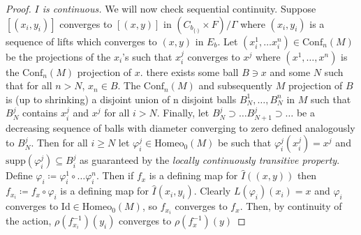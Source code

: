 \documentclass[10pt, oneside]{article}
\newcommand{\homeo}[1][S^1]{\text{Homeo}_0(#1)}
\newcommand{\conf}[2][S^1]{\text{Conf}_{#2}(#1)}
\newcommand{\set}{{\{\cdot\}}}
\newcommand{\maxcov}{C_{b_\set}}
\theoremstyle{definition}
\theoremstyle{definition}
\begin{document}
\begin{proof}
    \medskip
    {\it $I$ is continuous.} We will now check sequential continuity. Suppose $[(x_i, y_i)]$ converges to $[(x, y)]$ in $(\maxcov\times F)/\Gamma$ where $(x_i, y_i)$ is a sequence of lifts which converges to $(x,y)$ in $E_b$. Let $(x_i^1,\dots x_i^n)\in\conf[M]{n}$ be the projections of the $x_i$'s such that $x_i^j$ converges to $x^j$ where $(x^1,\dots, x^n)$ is the $\conf[M]{n}$ projection of $x$. there exists some ball $B\ni x$ and some $N$ such that for all $n> N$, $x_n\in B$. The $\conf[M]{n}$ and subsequently $M$ projection of $B$ is (up to shrinking) a disjoint union of n disjoint balls $B_N^1,\dots,B_N^n$ in $M$ such that $B_N^j$ contains $x_i^j$ and $x^j$ for all $i>N$. Finally, let $B_N^j\supset\dots B_{N+1}^j\supset\dots$ be a decreasing sequence of balls with diameter converging to zero defined analogously to $B_N^j$. Then for all $i\geq N$ let $\varphi_i^j\in\homeo[M]$ be such that $\varphi_i^j(x_i^j)=x^j$ and $\text{supp}(\varphi_i^j)\subseteq B_i^j$ as guaranteed by the {\it locally continuously transitive property}. Define $\varphi_i \coloneqq \varphi^1_i\circ\dots\varphi^n_i$. Then if $f_x$ is a defining map for $\hat{I}((x, y))$ then $f_{x_i}\coloneqq f_x\circ\varphi_i$ is a defining map for $\hat{I}(x_i, y_i)$. Clearly $L(\varphi_i)(x_i) = x$ and $\varphi_i$ converges to $\text{Id}\in\homeo[M]$, so $f_{x_i}$ converges to $f_x$. Then, by continuity of the action, $\rho(f_{x_i}^{-1})(y_i)$ converges to $\rho(f_x^{-1})(y)$
    

\end{proof}
\end{document}
